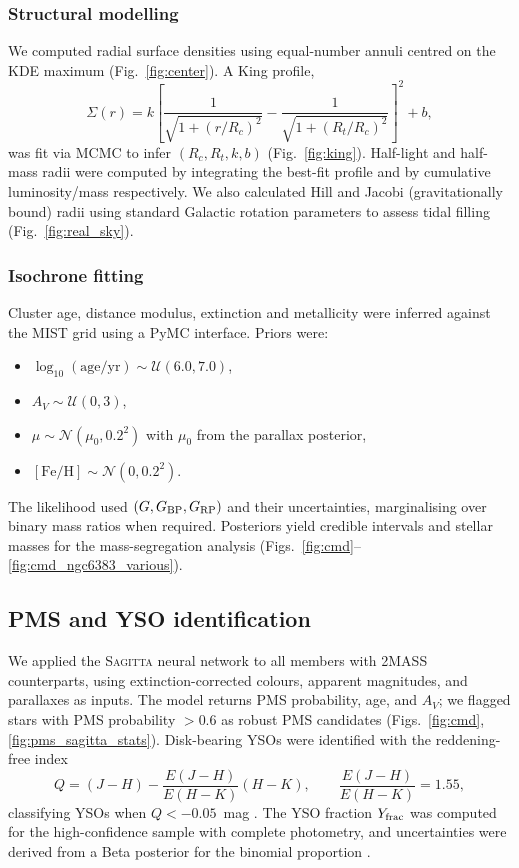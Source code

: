 \documentclass[../main.tex]{subfiles}
\begin{document}
\subsubsection{Structural modelling}
We computed radial surface densities using equal-number annuli centred on the KDE maximum (Fig.~\ref{fig:center}). A King profile,
\begin{equation*}
  \Sigma(r)=k\!\left[\frac{1}{\sqrt{1+(r/R_c)^2}}-\frac{1}{\sqrt{1+(R_t/R_c)^2}}\right]^2 + b,
\end{equation*}
was fit via MCMC to infer $(R_c,R_t,k,b)$ (Fig.~\ref{fig:king}). Half-light and half-mass radii were computed by integrating the best-fit profile and by cumulative luminosity/mass respectively. We also calculated Hill and Jacobi (gravitationally bound) radii using standard Galactic rotation parameters to assess tidal filling (Fig.~\ref{fig:real_sky}).

\subsubsection{Isochrone fitting}
Cluster age, distance modulus, extinction and metallicity were inferred against the MIST grid using a PyMC interface. Priors were:
\begin{itemize}
  \item $\log_{10}(\mathrm{age/yr}) \sim \mathcal{U}(6.0,7.0)$,
  \item $A_V \sim \mathcal{U}(0,3)$,
  \item $\mu \sim \mathcal{N}(\mu_0,0.2^2)$ with $\mu_0$ from the parallax posterior,
  \item $\mathrm{[Fe/H]} \sim \mathcal{N}(0,0.2^2)$.
\end{itemize}
The likelihood used $(G,G_{\rm BP},G_{\rm RP})$ and their uncertainties, marginalising over binary mass ratios when required. Posteriors yield credible intervals and stellar masses for the mass-segregation analysis (Figs.~\ref{fig:cmd}–\ref{fig:cmd_ngc6383_various}).

\subsection{PMS and YSO identification}
\label{subsec:pms-sagitta}
We applied the \textsc{Sagitta} neural network \citep{2021AJ....162..282M} to all members with 2MASS counterparts, using extinction-corrected colours, apparent magnitudes, and parallaxes as inputs. The model returns PMS probability, age, and $A_V$; we flagged stars with PMS probability $>0.6$ as robust PMS candidates (Figs.~\ref{fig:cmd}, \ref{fig:pms_sagitta_stats}). Disk-bearing YSOs were identified with the reddening-free index
\begin{equation}
Q=(J-H)-\frac{E(J-H)}{E(H-K)}(H-K), \qquad \frac{E(J\!-\!H)}{E(H\!-\!K)}=1.55,
\end{equation}
classifying YSOs when $Q<-0.05$~mag \citep{2013MNRAS.436.1465B}. The YSO fraction $Y_{\rm frac}$ was computed for the high-confidence sample with complete photometry, and uncertainties were derived from a Beta posterior for the binomial proportion \citep{2011PASA...28..128C}.
\end{document}
